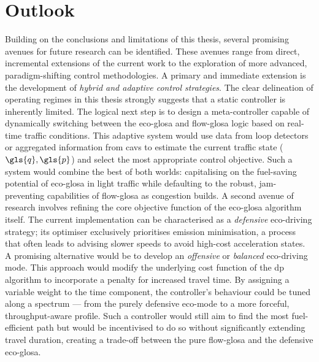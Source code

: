 \section{Outlook}
\label{sec:Outlook}

Building on the conclusions and limitations of this thesis, several promising avenues for future research can be identified. These avenues range from direct, incremental extensions of the current work to the exploration of more advanced, paradigm-shifting control methodologies.
\mynewline
A primary and immediate extension is the development of \textit{hybrid and adaptive control strategies}. The clear delineation of operating regimes in this thesis strongly suggests that a static controller is inherently limited. The logical next step is to design a meta-controller capable of dynamically switching between the \ac{eco-glosa} and \ac{flow-glosa} logic based on real-time traffic conditions. This adaptive system would use data from loop detectors or aggregated information from \acp{cav} to estimate the current traffic state ($\gls{q}, \gls{p}$) and select the most appropriate control objective. Such a system would combine the best of both worlds: capitalising on the fuel-saving potential of \ac{eco-glosa} in light traffic while defaulting to the robust, jam-preventing capabilities of \ac{flow-glosa} as congestion builds.
\mynewline
A second avenue of research involves refining the core objective function of the \ac{eco-glosa} algorithm itself. The current implementation can be characterised as a \textit{defensive} eco-driving strategy; its optimiser exclusively prioritises emission minimisation, a process that often leads to advising slower speeds to avoid high-cost acceleration states. A promising alternative would be to develop an \textit{offensive} or \textit{balanced} eco-driving mode. This approach would modify the underlying cost function of the \ac{dp} algorithm to incorporate a penalty for increased travel time. By assigning a variable weight to the time component, the controller's behaviour could be tuned along a spectrum --- from the purely defensive eco-mode to a more forceful, throughput-aware profile. Such a controller would still aim to find the most fuel-efficient path but would be incentivised to do so without significantly extending travel duration, creating a trade-off between the pure \ac{flow-glosa} and the defensive \ac{eco-glosa}.
\mynewline
